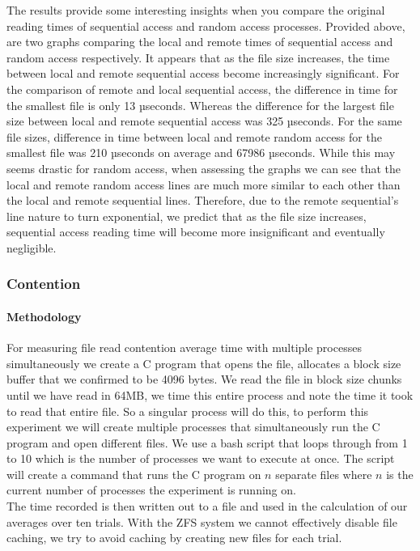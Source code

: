 The results provide some interesting insights when you compare the original reading times of sequential access and random access processes. Provided above, are two graphs comparing the local and remote times of sequential access and random access respectively. It appears that as the file size increases, the time between local and remote sequential access become increasingly significant. For the comparison of remote and local sequential access, the difference in time for the smallest file is only 13 µseconds. Whereas the difference for the largest file size between local and remote sequential access was 325 µseconds. For the same file sizes, difference in time between local and remote random access for the smallest file was 210 µseconds on average and 67986 µseconds. While this may seems drastic for random access, when assessing the graphs we can see that the local and remote random access lines are much more similar to each other than the local and remote sequential lines. Therefore, due to the remote sequential's line nature to turn exponential, we predict that as the file size increases, sequential access reading time will become more insignificant and eventually negligible.

\subsubsection{Contention}


\paragraph{Methodology}

For measuring file read contention average time with multiple processes simultaneously we create a C program that opens the file, allocates a block size buffer that we confirmed to be 4096 bytes. We read the file in block size chunks until we have read in 64MB, we time this entire process and note the time it took to read that entire file. So a singular process will do this, to perform this experiment we will create multiple processes that simultaneously run the C program and open different files. We use a bash script that loops through from 1 to 10 which is the number of processes we want to execute at once. The script will create a command that runs the C program on $n$ separate files where $n$ is the current number of processes the experiment is running on. \\
The time recorded is then written out to a file and used in the calculation of our averages over ten trials. With the ZFS system we cannot effectively disable file caching, we try to avoid caching by creating new files for each trial.

